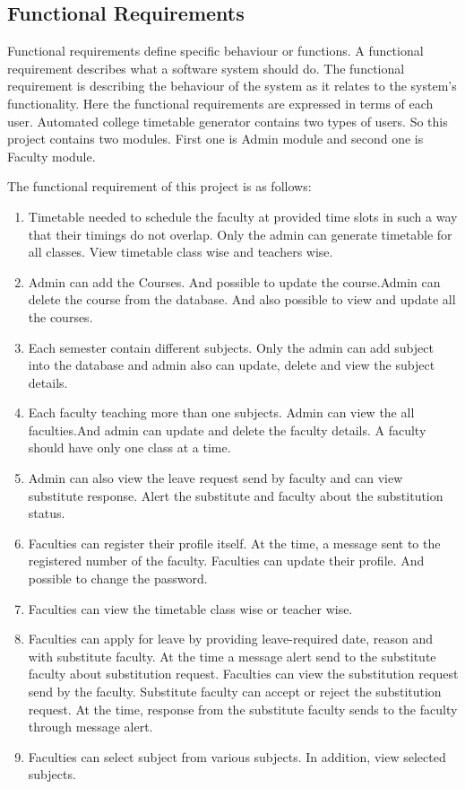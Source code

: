 \subsection{Functional Requirements}

Functional requirements define specific behaviour or functions. A functional requirement describes what a software system should do. The functional requirement is describing the behaviour of the system as it relates to the system's functionality. Here the functional requirements are expressed in terms of each user. Automated college timetable generator contains two types of users. So this project contains two modules. First one is Admin module and second one is Faculty module.

The functional requirement of this project is as follows:

\begin{enumerate}
\item Timetable needed to schedule the faculty at provided time slots in such a way that their timings do not overlap. Only the admin can generate timetable for all classes. View timetable class wise and teachers wise.
\item Admin can add the Courses. And possible to update the course.Admin can delete the course from the database. And also possible to view and update all the courses.
\item Each semester contain different subjects. Only the admin can add subject into the database and admin also can update, delete and view the subject details. 
\item Each faculty teaching more than one subjects. Admin can view the all faculties.And admin can update and delete the faculty details. A faculty should have only one class at a time.
\item Admin can also view the leave request send by faculty and can view substitute response. Alert the substitute and faculty about the substitution status.
\item Faculties can register their profile itself. At the time, a message sent to the registered number of the faculty. Faculties can update their profile. And possible to change the password.
\item Faculties can view the timetable class wise or teacher wise.
\item Faculties can apply for leave by providing leave-required date, reason and with substitute faculty. At the time a message alert send to the substitute faculty about substitution request. Faculties can view the substitution request send by the faculty. Substitute faculty can accept or reject the substitution request. At the time, response from the substitute faculty sends to the faculty through message alert.
\item Faculties can select subject from various subjects. In addition, view selected subjects.

\end{enumerate}

